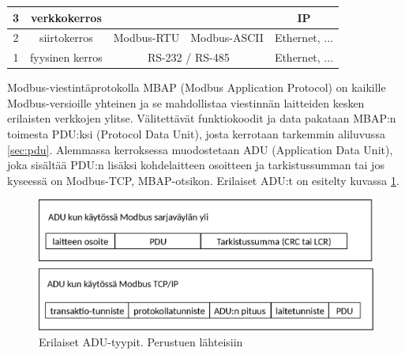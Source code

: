\begin{table}
\begin{tabular}{|c|c|ccc}
      3                                         & verkkokerros                     &                                                         & \multicolumn{1}{c|}{}                                     & \multicolumn{1}{c|}{IP}                                       \\ \hline
      2                                         & siirtokerros                     & \multicolumn{1}{c|}{\cellcolor[HTML]{6F6FE6}Modbus-RTU} & \multicolumn{1}{c|}{\cellcolor[HTML]{6F6FE6}Modbus-ASCII} & \multicolumn{1}{c|}{Ethernet, ...}                            \\ \hline
      1                                         & fyysinen kerros                  & \multicolumn{2}{c|}{RS-232 / RS-485}                                                                                & \multicolumn{1}{c|}{Ethernet, ...}                            \\ \hline
      \end{tabular}
      \label{rakenne}
    \end{table}

    Modbus-viestintäprotokolla \gls{MBAP} (Modbus Application Protocol) on kaikille Modbus-versioille yhteinen ja se mahdollistaa viestinnän laitteiden kesken erilaisten verkkojen ylitse. Välitettävät funktiokoodit ja data pakataan \gls{MBAP}:n toimesta \gls{PDU}:ksi (Protocol Data Unit), josta kerrotaan tarkemmin aliluvussa \ref{sec:pdu}. Alemmassa kerroksessa muodostetaan \gls{ADU} (Application Data Unit), joka sisältää PDU:n lisäksi kohdelaitteen osoitteen ja tarkistussumman tai jos kyseessä on Modbus-TCP, \gls{MBAP}-otsikon. Erilaiset ADU:t on esitelty kuvassa \ref{fig:adu}.
    \begin{figure}[h]
      \centering
      \includegraphics[width=1\textwidth]{figures/adu}
      \caption[ADU-tyypit]{Erilaiset ADU-tyypit.  Perustuen lähteisiin \parencite{modbusTCPIPSpec, modbusSerialSpec}}
      \label{fig:adu}
    \end{figure}

